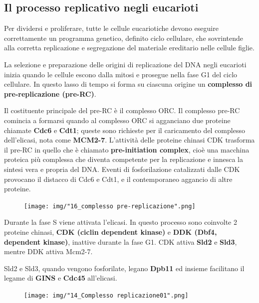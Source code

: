 \documentclass[11pt]{book}
\begin{document}
\subsection{Il processo replicativo negli
eucarioti}\label{il-processo-replicativo-negli-eucarioti}

Per dividersi e proliferare, tutte le cellule eucariotiche devono
eseguire correttamente un programma genetico, definito ciclo cellulare,
che sovrintende alla corretta replicazione e segregazione del materiale
ereditario nelle cellule figlie.

La selezione e preparazione delle origini di replicazione del DNA negli
eucarioti inizia quando le cellule escono dalla mitosi e prosegue nella
fase G1 del ciclo cellulare. In questo lasso di tempo si forma su
ciascuna origine un \textbf{complesso di pre-replicazione (pre-RC)}.

Il costituente principale del pre-RC è il complesso ORC. Il complesso
pre-RC comincia a formarsi quando al complesso ORC si agganciano due
proteine chiamate \textbf{Cdc6} e \textbf{Cdt1}; queste sono richieste
per il caricamento del complesso dell'elicasi, nota come
\textbf{MCM2-7}. L'attività delle proteine chinasi CDK trasforma il
pre-RC in quello che è chiamato \textbf{pre-initiation complex}, cioè
una macchina proteica più complessa che diventa competente per la
replicazione e innesca la sintesi vera e propria del DNA. Eventi di
fosforilazione catalizzati dalle CDK provocano il distacco di Cdc6 e
Cdt1, e il contemporaneo aggancio di altre proteine.

\begin{figure}[htp]
\centering
\texttt{[image: img/"16\_complesso pre-replicazione".png]}
\caption{}
\label{complesso-pre-replicazione}
\end{figure}

Durante la fase S viene attivata l'elicasi. In questo processo sono
coinvolte 2 proteine chinasi, \textbf{CDK (ciclin dependent kinase)} e
\textbf{DDK (Dbf4, dependent kinase)}, inattive durante la fase G1. CDK
attiva \textbf{Sld2} e \textbf{Sld3}, mentre DDK attiva Mcm2-7.

Sld2 e Sld3, quando vengono fosforilate, legano \textbf{Dpb11} ed
insieme facilitano il legame di \textbf{GINS} e \textbf{Cdc45}
all'elicasi.

\begin{figure}[htp]
\centering
\texttt{[image: img/"14\_Complesso replicazione01".png]}
\caption{}
\label{complesso-replicazione01}
\end{figure}
\end{document}
